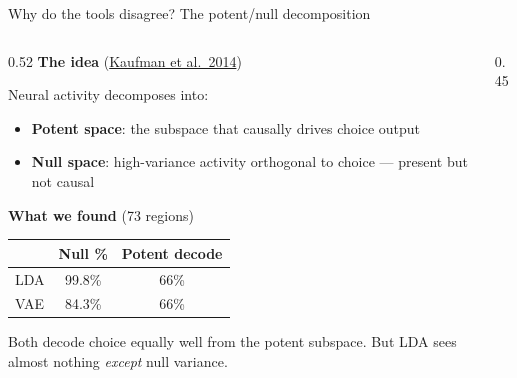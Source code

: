 \documentclass[aspectratio=169,11pt]{beamer}
\begin{document}
\begin{frame}{Why do the tools disagree? The potent/null decomposition}

\begin{columns}[T]
\begin{column}{0.52\textwidth}
\textbf{The idea} {\scriptsize (\href{https://doi.org/10.1038/nn.3643}{Kaufman et al.\ 2014})}

\vspace{0.3em}
{\small Neural activity decomposes into:}
\begin{itemize}\setlength\itemsep{0.3em}
  \item {\small \textbf{\textcolor{choice}{Potent space}}: the subspace that causally drives choice output}
  \item {\small \textbf{\textcolor{neutral}{Null space}}: high-variance activity orthogonal to choice --- present but not causal}
\end{itemize}

\vspace{0.5em}
\textbf{What we found} {\scriptsize (73 regions)}

\vspace{0.3em}
{\small
\begin{tabular}{lcc}
\toprule
& \textbf{Null \%} & \textbf{Potent decode} \\
\midrule
LDA & 99.8\% & 66\% \\
VAE & 84.3\% & 66\% \\
\bottomrule
\end{tabular}
}

\vspace{0.5em}
{\small Both decode choice equally well from the potent subspace. But LDA sees almost nothing \emph{except} null variance.}
\end{column}

\begin{column}{0.45\textwidth}
\centering
\vspace{0.5em}
\end{column}
\end{columns}
\end{frame}
\end{document}

